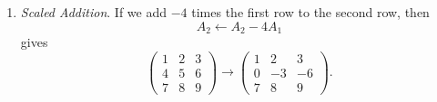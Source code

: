 \begin{example}
\begin{enumerate}
			\item \textit{Scaled Addition}. If we add $-4$ times the first row to the second row, then
			\begin{equation}
			  A_2 \gets A_2 - 4 A_1
			\end{equation}
			gives
			\begin{equation}
			  \begin{pmatrix}
			  	1 & 2 & 3 \\
			  	4 & 5 & 6 \\
			  	7 & 8 & 9
			  \end{pmatrix}
			  \to
			  \begin{pmatrix}
			  	1 & 2 & 3 \\
			  	0 & -3 & -6 \\
			  	7 & 8 & 9
			  \end{pmatrix}.
			\end{equation}
		\end{enumerate}
	\end{example}

